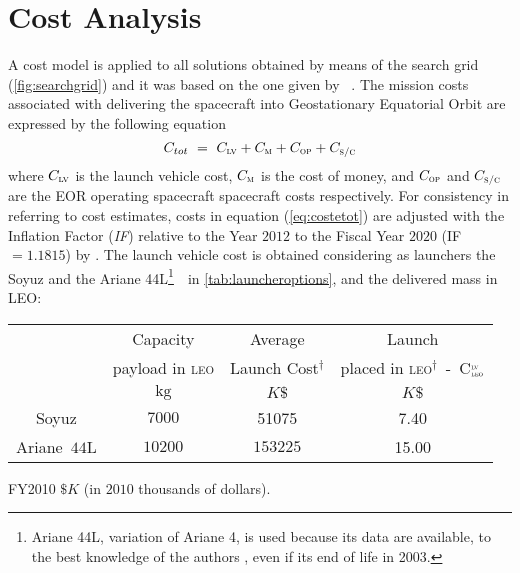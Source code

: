 
\section{Cost Analysis}
\label{sec:costanalysis}
A cost model is applied to all solutions obtained by means of the search grid (\figurename\ref{fig:searchgrid}) and it was based on the one given by \citeauthor{Randolph:2002aa}~\cite{Randolph:2002aa}. The mission costs associated with delivering the spacecraft into Geostationary Equatorial Orbit are expressed by the following equation
\begin{equation}
C_{\scriptstyle{tot}}~=~C_{\scriptstyle{\textsc{lv}}}+C_{\scriptstyle{\textsc{m}}}+C_{\scriptstyle{\textsc{op}}}+C_{\scriptstyle{\textsc{s/c}}}
\label{eq:costetot}
\end{equation}
where $C_{\scriptstyle{\textsc{lv}}}$ is the launch vehicle cost, $C_{\scriptstyle{\textsc{m}}}$ is the cost of money, and $C_{\scriptstyle{\textsc{op}}}$ and $C_{\scriptstyle{\textsc{s/c}}}$ are the EOR operating spacecraft spacecraft costs respectively.
For consistency in referring to cost estimates, costs in equation (\ref{eq:costetot}) are adjusted with the Inflation Factor (\textit{IF}) relative to the Year $2012$ to the Fiscal Year $2020$ (IF$=1.1815$) by \cite{wertz2011space}.
The launch vehicle cost is obtained considering as launchers the Soyuz and the Ariane 44L\footnote{Ariane 44L, variation of Ariane 4, is used because its data are available, to the best knowledge of the authors , even if its end of life in 2003.}~\cite{wertz2011space}~in \tablename\ref{tab:launcheroptions}, and the delivered mass in LEO:
%
\begin{table*}[htp]
\footnotesize
\centering
\caption[Launcher options.]{\textbf{Launcher options.}}
\label{tab:launcheroptions}
\begin{threeparttable}
\begin{tabular}{*{4}{c}}
\toprule
\toprule
&Capacity &Average &Launch\\
&payload in \textsc{leo}&Launch Cost$^{\dagger}$&placed in \textsc{leo}$^{\dagger}$~-~C${\scriptstyle{_{\textsc{leo}}^{\textsc{lv}}}}$\\
&\multicolumn{1}{c}{$\si{\kilo\gram}$}&\multicolumn{1}{c}{$K\$$}&\multicolumn{1}{c}{$K\$$}\\
\midrule
Soyuz&$7000$&51075&7.40\\
Ariane~$44$L&$10200$&$153225$&15.00\\
\bottomrule
\bottomrule
\end{tabular}
\begin{tablenotes}
\small
\item[$\dagger$] FY2010 $\$K$ (in $2010$ thousands of dollars).
\end{tablenotes}
\end{threeparttable}
\end{table*}
